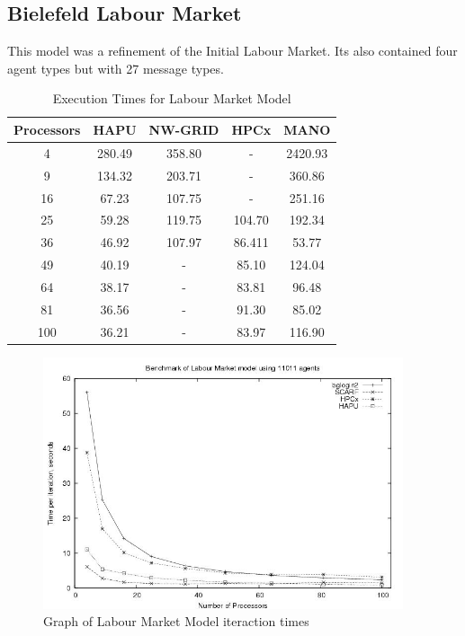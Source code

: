 \subsection{Bielefeld Labour Market}
This model was a refinement of the Initial Labour Market. Its also contained four agent types but with 27 message types.
{
\renewcommand{\arraystretch}{1.25}
\begin{table}[ht]
	\centering
		\begin{tabular}{c|cccc}
		Processors		&HAPU		&NW-GRID		&HPCx		&MANO			\\ \hline
		4							&280.49	&358.80 		&- 			&2420.93 	\\
		9 						&134.32	&203.71			&-			&360.86		\\
		16 						&67.23	&107.75			&-			&251.16		\\
		25 						&59.28	&119.75			&104.70	&192.34		\\
		36 						&46.92	&107.97			&86.411	&53.77		\\
		49 						&40.19	&-					&85.10	&124.04		\\
		64 						&38.17	&-					&83.81	&96.48	 	\\
		81 						&36.56	&-					&91.30	&85.02		\\
		100 					&36.21	&-					&83.97	&116.90		\\
	\end{tabular}
	\caption{Execution Times for Labour Market Model}
	\label{tab:ExecutionTimesForLabour}
\end{table}
}
\bigskip
\begin{figure}[ht]
	\centering
		\includegraphics[width=300pt]{Labour-graph.jpg}
	\caption{Graph of Labour Market Model iteraction times}
	\label{fig:Labour-graph}
\end{figure}


